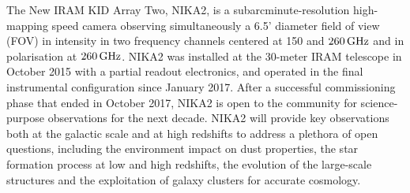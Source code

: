 %
%

The New IRAM KID Array Two, NIKA2, is a subarcminute-resolution
high-mapping speed camera observing simultaneously a 6.5' diameter
field of view (FOV) in intensity in two
frequency channels centered at 150 and $260\,\rm{GHz}$ and in
polarisation at $260\, \rm{GHz}$. NIKA2 was installed at the
30-meter IRAM telescope in October 2015 with a partial readout
electronics, and operated in the final instrumental configuration since
January 2017. After a successful
commissioning phase that ended in October 2017, NIKA2 is
open to the community for science-purpose observations for the next
decade. NIKA2 will provide key observations both at the galactic scale
and at high redshifts to address a plethora of open questions, including
the environment impact on dust properties, the star formation process
at low and high redshifts, the evolution of the large-scale structures
and the exploitation of galaxy clusters for accurate cosmology.
%
%

